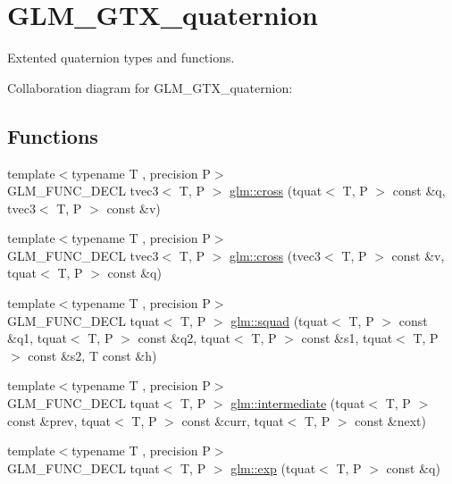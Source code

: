 \hypertarget{group__gtx__quaternion}{\section{G\-L\-M\-\_\-\-G\-T\-X\-\_\-quaternion}
\label{group__gtx__quaternion}
}


Extented quaternion types and functions.  


Collaboration diagram for G\-L\-M\-\_\-\-G\-T\-X\-\_\-quaternion\-:
\subsection*{Functions}
\begin{DoxyCompactItemize}
\item 
{\footnotesize template$<$typename T , precision P$>$ }\\G\-L\-M\-\_\-\-F\-U\-N\-C\-\_\-\-D\-E\-C\-L tvec3$<$ T, P $>$ \hyperlink{group__gtx__quaternion_ga33ecf8ba903eee5fc09f0fbfc0d5ca6b}{glm\-::cross} (tquat$<$ T, P $>$ const \&q, tvec3$<$ T, P $>$ const \&v)
\item 
{\footnotesize template$<$typename T , precision P$>$ }\\G\-L\-M\-\_\-\-F\-U\-N\-C\-\_\-\-D\-E\-C\-L tvec3$<$ T, P $>$ \hyperlink{group__gtx__quaternion_ga4bfe3c7770fc43d14b8ef0058c4a86b5}{glm\-::cross} (tvec3$<$ T, P $>$ const \&v, tquat$<$ T, P $>$ const \&q)
\item 
{\footnotesize template$<$typename T , precision P$>$ }\\G\-L\-M\-\_\-\-F\-U\-N\-C\-\_\-\-D\-E\-C\-L tquat$<$ T, P $>$ \hyperlink{group__gtx__quaternion_gae75f537becdf2b1381b4482ec96e6c82}{glm\-::squad} (tquat$<$ T, P $>$ const \&q1, tquat$<$ T, P $>$ const \&q2, tquat$<$ T, P $>$ const \&s1, tquat$<$ T, P $>$ const \&s2, T const \&h)
\item 
{\footnotesize template$<$typename T , precision P$>$ }\\G\-L\-M\-\_\-\-F\-U\-N\-C\-\_\-\-D\-E\-C\-L tquat$<$ T, P $>$ \hyperlink{group__gtx__quaternion_ga56abae85b3669c866e91f3c57b298b9c}{glm\-::intermediate} (tquat$<$ T, P $>$ const \&prev, tquat$<$ T, P $>$ const \&curr, tquat$<$ T, P $>$ const \&next)
\item 
{\footnotesize template$<$typename T , precision P$>$ }\\G\-L\-M\-\_\-\-F\-U\-N\-C\-\_\-\-D\-E\-C\-L tquat$<$ T, P $>$ \hyperlink{group__gtx__quaternion_ga17295173d4c2b5ae49b84e9993b63a62}{glm\-::exp} (tquat$<$ T, P $>$ const \&q)

\end{DoxyCompactItemize}
